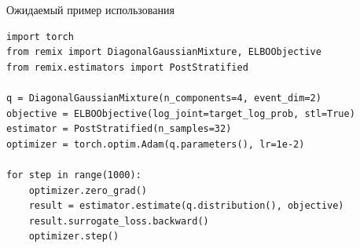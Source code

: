 \documentclass[aspectratio=169]{beamer}
\begin{document}
\begin{frame}[fragile]{Ожидаемый пример использования}
  \begin{lstlisting}
import torch
from remix import DiagonalGaussianMixture, ELBOObjective
from remix.estimators import PostStratified

q = DiagonalGaussianMixture(n_components=4, event_dim=2)
objective = ELBOObjective(log_joint=target_log_prob, stl=True)
estimator = PostStratified(n_samples=32)
optimizer = torch.optim.Adam(q.parameters(), lr=1e-2)

for step in range(1000):
    optimizer.zero_grad()
    result = estimator.estimate(q.distribution(), objective)
    result.surrogate_loss.backward()
    optimizer.step()
  \end{lstlisting}
\end{frame}
\end{document}
